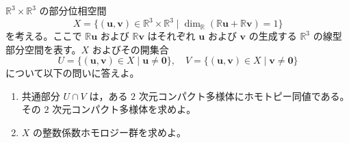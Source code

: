 \documentclass[12pt]{jlreq}
\newcommand{\R}{\mathbb{R}}
\begin{document}
$\R^3 \times \R^3$ の部分位相空間
\[
  X = \{ (\mathbf{u}, \mathbf{v}) \in \R^3 \times \R^3 \mid \dim_{\R} (\R\mathbf{u} + \R\mathbf{v}) = 1 \}
\]
を考える。ここで $\R\mathbf{u}$ および $\R\mathbf{v}$ はそれぞれ $\mathbf{u}$ および $\mathbf{v}$ の生成する $\R^3$ の線型部分空間を表す。$X$ およびその開集合
\[
  U = \{ (\mathbf{u}, \mathbf{v}) \in X \mid \mathbf{u} \ne \mathbf{0} \},\quad V = \{ (\mathbf{u}, \mathbf{v}) \in X \mid \mathbf{v} \ne \mathbf{0} \}
\]
について以下の問いに答えよ。

\begin{enumerate}
  \item 共通部分 $U \cap V$ は，ある $2$ 次元コンパクト多様体にホモトピー同値である。その $2$ 次元コンパクト多様体を求めよ。
  \item $X$ の整数係数ホモロジー群を求めよ。
\end{enumerate}
\end{document}
